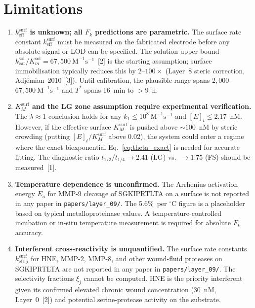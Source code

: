 \documentclass[10pt,a4paper]{article}
\numberwithin{equation}{section}
\newcommand{\Mms}{\text{M}^{-1}\text{s}^{-1}}
\newcommand{\cit}[1]{[#1]}
\newcommand{\kcat}{k_{\text{cat}}}
\newcommand{\keff}{k_{\text{eff}}}
\begin{document}
\section{Limitations}
\label{sec:limitations}

\begin{enumerate}[leftmargin=*]

  \item \textbf{$\keff^{\text{surf}}$ is unknown; all $F_k$ predictions are parametric.}
    The surface rate constant $\keff^{\text{surf}}$ must be measured on the fabricated
    electrode before any absolute signal or LOD can be specified. The solution upper bound
    $\kcat^{\text{sol}}/K_m^{\text{sol}} = 67{,}500\ \Mms$~\cit{2} is the starting
    assumption; surface immobilisation typically reduces this by $2$--$100\times$
    (Layer~8 steric correction, Adjémian~2010~\cit{3}). Until calibration, the plausible
    range spans $2{,}000$--$67{,}500\ \Mms$ and $T^*$ spans 16~min to $>9$~h.

  \item \textbf{$K_M^{\text{surf}}$ and the LG zone assumption require experimental
    verification.} The $\lambda \approx 1$ conclusion holds for any $k_1 \leq 10^8\ \Mms$
    and $[E]_t \leq 2.17$~nM. However, if the effective surface $K_M^{\text{surf}}$ is
    pushed above $\sim 100$~nM by steric crowding (putting $[E]_t/K_M^{\text{surf}}$
    above 0.02), the system could enter a regime where the exact biexponential
    Eq.~\eqref{eq:theta_exact} is needed for accurate fitting. The diagnostic ratio
    $t_{1/2}/t_{1/4} \to 2.41$ (LG) vs.\ $\to 1.75$ (FS) should be measured~\cit{1}.

  \item \textbf{Temperature dependence is unconfirmed.}
    The Arrhenius activation energy $E_a$ for MMP-9 cleavage of SGKIPRTLTA on a
    surface is not reported in any paper in \texttt{papers/layer\_09/}. The 5.6\%~per
    ${}^\circ$C figure is a placeholder based on typical metalloproteinase values. A
    temperature-controlled incubation or in-situ temperature measurement is required
    for absolute $F_k$ accuracy.

  \item \textbf{Interferent cross-reactivity is unquantified.}
    The surface rate constants $k_{\text{eff},j}^{\text{surf}}$ for HNE, MMP-2, MMP-8, and
    other wound-fluid proteases on SGKIPRTLTA are not reported in any paper in
    \texttt{papers/layer\_09/}. The selectivity fractions $\xi_j$ cannot be computed.
    HNE is the priority interferent given its confirmed elevated chronic wound
    concentration (30~nM, Layer~0~\cit{2}) and potential serine-protease activity on
    the substrate.


\end{enumerate}
\end{document}
